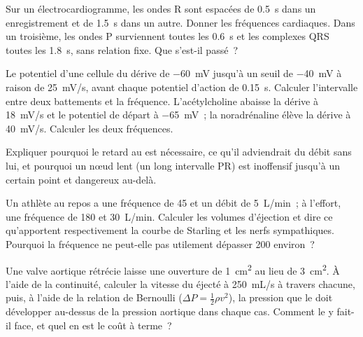 \begin{exercise}[$\star\star$]\label{exo:b2:heart:7}
Sur un électrocardiogramme, les ondes R sont espacées de \qty{0.5}{s}
dans un enregistrement et de \qty{1.5}{s} dans un autre. Donner les
fréquences cardiaques. Dans un troisième, les ondes P surviennent toutes
les \qty{0.6}{s} et les complexes QRS toutes les \qty{1.8}{s}, sans
relation fixe. Que s'est-il passé~?
\end{exercise}

\begin{exercise}[$\star\star$]\label{exo:b2:heart:8}
Le potentiel d'une cellule du  dérive de \qty{-60}{mV}
jusqu'à un seuil de \qty{-40}{mV} à raison de \qty{25}{mV/s}, avant
chaque potentiel d'action de \qty{0.15}{s}. Calculer l'intervalle entre
deux battements et la fréquence. L'acétylcholine abaisse la dérive à
\qty{18}{mV/s} et le potentiel de départ à \qty{-65}{mV}~; la
noradrénaline élève la dérive à \qty{40}{mV/s}. Calculer les deux
fréquences.
\end{exercise}

\begin{exercise}[$\star\star$]\label{exo:b2:heart:9}
Expliquer pourquoi le retard au  est nécessaire,
ce qu'il adviendrait du débit sans lui, et pourquoi un nœud lent (un long
intervalle PR) est inoffensif jusqu'à un certain point et dangereux
au-delà.
\end{exercise}

\begin{exercise}[$\star\star\star$]\label{exo:b2:heart:10}
Un athlète au repos a une fréquence de 45 et un débit de \qty{5}{L/min}~;
à l'effort, une fréquence de 180 et \qty{30}{L/min}. Calculer les volumes
d'éjection et dire ce qu'apportent respectivement la courbe de Starling
et les nerfs sympathiques. Pourquoi la fréquence ne peut-elle pas
utilement dépasser 200 environ~?
\end{exercise}

\begin{exercise}[$\star\star\star$]\label{exo:b2:heart:11}
Une valve aortique rétrécie laisse une ouverture de \qty{1}{cm^2} au lieu
de \qty{3}{cm^2}. À l'aide de la continuité, calculer la vitesse du 
éjecté à \qty{250}{mL/s} à travers chacune, puis, à l'aide de la relation
de Bernoulli ($\Delta P = \tfrac12\rho v^2$), la pression que le
 doit développer au-dessus de la pression aortique dans chaque
cas. Comment le  y fait-il face, et quel en est le coût à
terme~?
\end{exercise}

